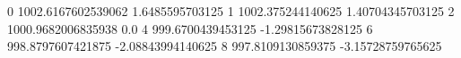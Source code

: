0 1002.6167602539062 1.6485595703125
1 1002.375244140625 1.40704345703125
2 1000.9682006835938 0.0
4 999.6700439453125 -1.29815673828125
6 998.8797607421875 -2.08843994140625
8 997.8109130859375 -3.15728759765625
